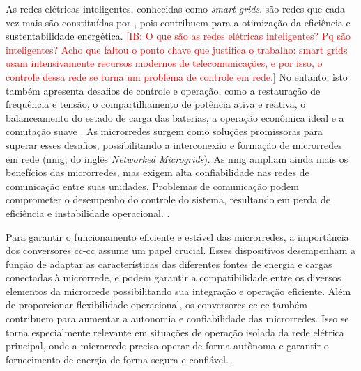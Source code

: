 As redes elétricas inteligentes, conhecidas como \textit{smart grids}, são redes que cada vez mais são constituídas por , pois contribuem para a otimização da eficiência e sustentabilidade energética. \textcolor{red}{[IB: O que são as redes elétricas inteligentes? Pq são inteligentes? Acho que faltou o ponto chave que justifica o trabalho: smart grids usam intensivamente recursos modernos de telecomunicações, e por isso, o controle dessa rede se torna um problema de controle em rede.]}  No entanto, isto também apresenta desafios de controle e operação, como a restauração de frequência e tensão, o compartilhamento de potência ativa e reativa, o balanceamento do estado de carga das baterias, a operação econômica ideal e a comutação suave \cite{Zhou2020}. As microrredes surgem como soluções promissoras para superar esses desafios, possibilitando a interconexão e formação de microrredes em rede (\acrshort{nmg}, do inglês \textit{Networked Microgrids}). As \acrshort{nmg} ampliam ainda mais os benefícios das microrredes, mas exigem alta confiabilidade nas redes de comunicação entre suas unidades. Problemas de comunicação podem comprometer o desempenho do controle do sistema, resultando em perda de eficiência e instabilidade operacional. \cite{Zhou2020}.

Para garantir o funcionamento eficiente e estável das microrredes, a importância dos conversores \acrshort{cc}-\acrshort{cc} assume um papel crucial. Esses dispositivos desempenham a função de adaptar as características das diferentes fontes de energia e cargas conectadas à microrrede, e podem garantir a compatibilidade entre os diversos elementos da microrrede possibilitando sua integração e operação eficiente. Além de proporcionar flexibilidade operacional, os conversores \acrshort{cc}-\acrshort{cc} também contribuem para aumentar a autonomia e confiabilidade das microrredes. Isso se torna especialmente relevante em situações de operação isolada da rede elétrica principal, onde a microrrede precisa operar de forma autônoma e garantir o fornecimento de energia de forma segura e confiável. \cite{bessa2022}.

